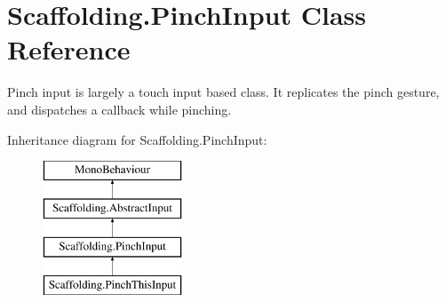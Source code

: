 \hypertarget{class_scaffolding_1_1_pinch_input}{\section{Scaffolding.\+Pinch\+Input Class Reference}
\label{class_scaffolding_1_1_pinch_input}
}


Pinch input is largely a touch input based class. It replicates the pinch gesture, and dispatches a callback while pinching.  


Inheritance diagram for Scaffolding.\+Pinch\+Input\+:\begin{figure}[H]
\begin{center}
\leavevmode
\includegraphics[height=4.000000cm]{class_scaffolding_1_1_pinch_input}
\end{center}
\end{figure}
